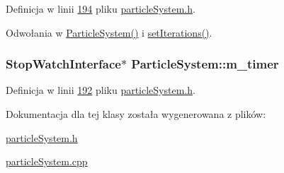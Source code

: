 Definicja w linii \hyperlink{particle_system_8h_source_l00194}{194} pliku \hyperlink{particle_system_8h_source}{particle\-System.\-h}.



Odwołania w \hyperlink{particle_system_8cpp_source_l00033}{Particle\-System()} i \hyperlink{particle_system_8h_source_l00074}{set\-Iterations()}.

\hypertarget{class_particle_system_af01e546384ef27bb1894a37f2a02e967}{
\subsubsection[{m\-\_\-timer}]{\setlength{\rightskip}{0pt plus 5cm}Stop\-Watch\-Interface$\ast$ Particle\-System\-::m\-\_\-timer\hspace{0.3cm}{\ttfamily [protected]}}}\label{class_particle_system_af01e546384ef27bb1894a37f2a02e967}


Definicja w linii \hyperlink{particle_system_8h_source_l00192}{192} pliku \hyperlink{particle_system_8h_source}{particle\-System.\-h}.



Dokumentacja dla tej klasy została wygenerowana z plików\-:\begin{DoxyCompactItemize}
\item 
\hyperlink{particle_system_8h}{particle\-System.\-h}\item 
\hyperlink{particle_system_8cpp}{particle\-System.\-cpp}\end{DoxyCompactItemize}
